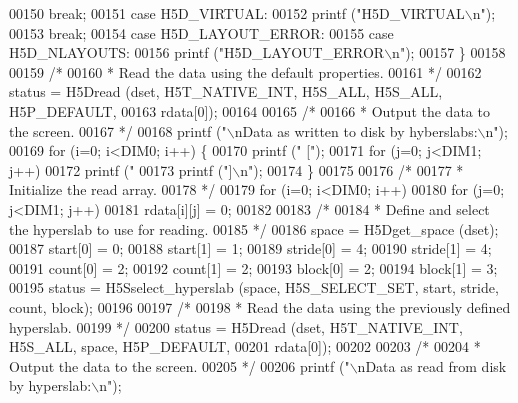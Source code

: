 \begin{DoxyCode}
{{00150             \textcolor{keywordflow}{break};
00151         \textcolor{keywordflow}{case} H5D\_VIRTUAL:
00152             printf (\textcolor{stringliteral}{"H5D\_VIRTUAL\(\backslash\)n"});
00153             \textcolor{keywordflow}{break};
00154         \textcolor{keywordflow}{case} H5D\_LAYOUT\_ERROR:
00155         \textcolor{keywordflow}{case} H5D\_NLAYOUTS:
00156             printf (\textcolor{stringliteral}{"H5D\_LAYOUT\_ERROR\(\backslash\)n"});
00157     \}
00158 
00159     \textcolor{comment}{/*}
00160 \textcolor{comment}{     * Read the data using the default properties.}
00161 \textcolor{comment}{     */}
00162     status = H5Dread (dset, H5T\_NATIVE\_INT, H5S\_ALL, H5S\_ALL, H5P\_DEFAULT,
00163                 rdata[0]);
00164 
00165     \textcolor{comment}{/*}
00166 \textcolor{comment}{     * Output the data to the screen.}
00167 \textcolor{comment}{     */}
00168     printf (\textcolor{stringliteral}{"\(\backslash\)nData as written to disk by hyberslabs:\(\backslash\)n"});
00169     \textcolor{keywordflow}{for} (i=0; i<DIM0; i++) \{
00170         printf (\textcolor{stringliteral}{" ["});
00171         \textcolor{keywordflow}{for} (j=0; j<DIM1; j++)
00172             printf (\textcolor{stringliteral}{" %
00173         printf (\textcolor{stringliteral}{"]\(\backslash\)n"});
00174     \}
00175 
00176     \textcolor{comment}{/*}
00177 \textcolor{comment}{     * Initialize the read array.}
00178 \textcolor{comment}{     */}
00179     \textcolor{keywordflow}{for} (i=0; i<DIM0; i++)
00180         \textcolor{keywordflow}{for} (j=0; j<DIM1; j++)
00181             rdata[i][j] = 0;
00182 
00183     \textcolor{comment}{/*}
00184 \textcolor{comment}{     * Define and select the hyperslab to use for reading.}
00185 \textcolor{comment}{     */}
00186     space = H5Dget\_space (dset);
00187     start[0] = 0;
00188     start[1] = 1;
00189     stride[0] = 4;
00190     stride[1] = 4;
00191     count[0] = 2;
00192     count[1] = 2;
00193     block[0] = 2;
00194     block[1] = 3;
00195     status = H5Sselect\_hyperslab (space, H5S\_SELECT\_SET, start, stride, count, block);
00196 
00197     \textcolor{comment}{/*}
00198 \textcolor{comment}{     * Read the data using the previously defined hyperslab.}
00199 \textcolor{comment}{     */}
00200     status = H5Dread (dset, H5T\_NATIVE\_INT, H5S\_ALL, space, H5P\_DEFAULT,
00201                 rdata[0]);
00202 
00203     \textcolor{comment}{/*}
00204 \textcolor{comment}{     * Output the data to the screen.}
00205 \textcolor{comment}{     */}
00206     printf (\textcolor{stringliteral}{"\(\backslash\)nData as read from disk by hyperslab:\(\backslash\)n"});
}}}
\end{DoxyCode}
